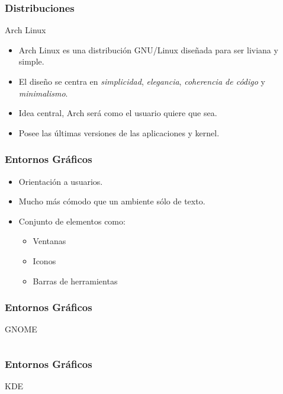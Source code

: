\frame
{
\frametitle{Distribuciones}
\Large{Arch Linux}
\normalsize
\begin{itemize}
	\item Arch Linux es una distribución GNU/Linux diseñada para ser liviana y simple.
	\item El diseño se centra en \emph{simplicidad}, \emph{elegancia}, \emph{coherencia de código} y \emph{minimalismo}.
	\item Idea central, Arch será como el usuario quiere que sea.
	\item Posee las últimas versiones de las aplicaciones y kernel.
\end{itemize}
}



\frame
{
\frametitle{Entornos Gráficos}
\begin{itemize}
	\item Orientación a usuarios.
	\item Mucho más cómodo que un ambiente sólo de texto.
	\item Conjunto de elementos como:
	\begin{itemize}
		\item Ventanas
		\item Iconos
		\item Barras de herramientas
	\end{itemize}
\end{itemize}
}

\frame
{
\frametitle{Entornos Gráficos}
\Large{GNOME}
\begin{columns}
	\begin{column}{0.2\textwidth}
	\end{column}
	\begin{column}{0.8\textwidth}
		\begin{center}
		\end{center}
	\end{column}
\end{columns}
}

\frame
{
\frametitle{Entornos Gráficos}
\Large{KDE}
\begin{columns}
	\begin{column}{0.2\textwidth}
	\end{column}
	\begin{column}{0.8\textwidth}
		\begin{center}
		\end{center}
	\end{column}
\end{columns}
}

